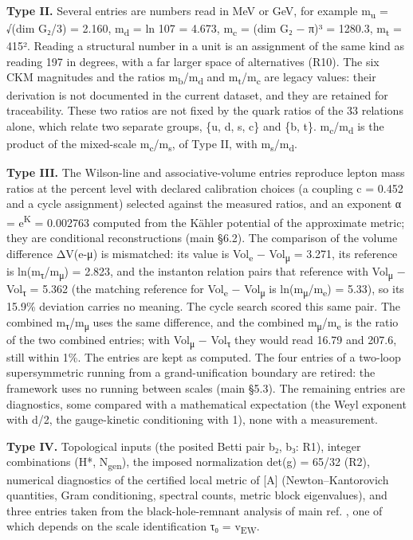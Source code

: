 \documentclass[11pt,a4paper]{article}
\begin{document}
\textbf{Type II.} Several entries are numbers read in MeV or GeV, for example m\textsubscript{u} = √(dim G₂/3) = 2.160, m\textsubscript{d} = ln 107 = 4.673, m\textsubscript{c} = (dim G₂ − π)³ = 1280.3, m\textsubscript{t} = 415². Reading a structural number in a unit is an assignment of the same kind as reading 197 in degrees, with a far larger space of alternatives (R10). The six CKM magnitudes and the ratios m\textsubscript{b}/m\textsubscript{d} and m\textsubscript{t}/m\textsubscript{c} are legacy values: their derivation is not documented in the current dataset, and they are retained for traceability. These two ratios are not fixed by the quark ratios of the 33 relations alone, which relate two separate groups, \{u, d, s, c\} and \{b, t\}. m\textsubscript{c}/m\textsubscript{d} is the product of the mixed-scale m\textsubscript{c}/m\textsubscript{s}, of Type II, with m\textsubscript{s}/m\textsubscript{d}.

\textbf{Type III.} The Wilson-line and associative-volume entries reproduce lepton mass ratios at the percent level with declared calibration choices (a coupling c = 0.452 and a cycle assignment) selected against the measured ratios, and an exponent α = e\textsuperscript{K} = 0.002763 computed from the Kähler potential of the approximate metric; they are conditional reconstructions (main §6.2). The comparison of the volume difference ΔV(e-μ) is mismatched: its value is Vol\textsubscript{e} − Vol\textsubscript{μ} = 3.271, its reference is ln(m\textsubscript{τ}/m\textsubscript{μ}) = 2.823, and the instanton relation pairs that reference with Vol\textsubscript{μ} − Vol\textsubscript{τ} = 5.362 (the matching reference for Vol\textsubscript{e} − Vol\textsubscript{μ} is ln(m\textsubscript{μ}/m\textsubscript{e}) = 5.33), so its 15.9\% deviation carries no meaning. The cycle search scored this same pair. The combined m\textsubscript{τ}/m\textsubscript{μ} uses the same difference, and the combined m\textsubscript{μ}/m\textsubscript{e} is the ratio of the two combined entries; with Vol\textsubscript{μ} − Vol\textsubscript{τ} they would read 16.79 and 207.6, still within 1\%. The entries are kept as computed. The four entries of a two-loop supersymmetric running from a grand-unification boundary are retired: the framework uses no running between scales (main §5.3). The remaining entries are diagnostics, some compared with a mathematical expectation (the Weyl exponent with d/2, the gauge-kinetic conditioning with 1), none with a measurement.

\textbf{Type IV.} Topological inputs (the posited Betti pair b₂, b₃: R1), integer combinations (H*, N\textsubscript{gen}), the imposed normalization det(g) = 65/32 (R2), numerical diagnostics of the certified local metric of {[}A{]} (Newton--Kantorovich quantities, Gram conditioning, spectral counts, metric block eigenvalues), and three entries taken from the black-hole-remnant analysis of main ref. \cite{42}, one of which depends on the scale identification τ₀ = v\textsubscript{EW}.
\end{document}
